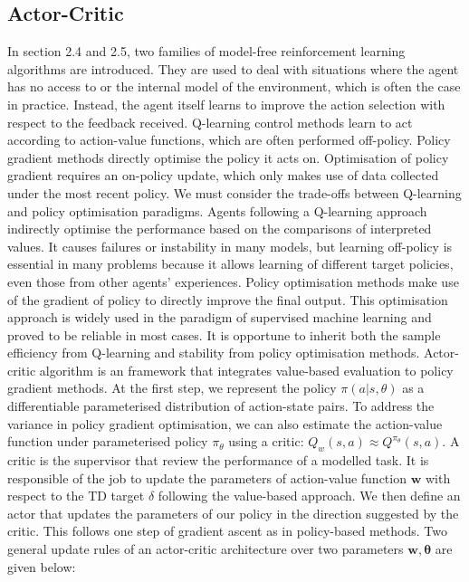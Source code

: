\documentclass[oneside,11pt,a4paper]{article}
\begin{document}
\subsection{Actor-Critic}
In section 2.4 and 2.5, two families of model-free reinforcement learning algorithms are introduced. They are used to deal with situations where the agent has no access to or the internal model of the environment, which is often the case in practice. Instead, the agent itself learns to improve the action selection with respect to the feedback received. Q-learning control methods learn to act according to action-value functions, which are often performed off-policy. Policy gradient methods directly optimise the policy it acts on. Optimisation of policy gradient requires an on-policy update, which only makes use of data collected under the most recent policy.
\newline
\newline
\noindent
We must consider the trade-offs between Q-learning and policy optimisation paradigms. Agents following a Q-learning approach indirectly optimise the performance based on the comparisons of interpreted values. It causes failures or instability in many models, but learning off-policy is essential in many problems because it allows learning of different target policies, even those from other agents' experiences. Policy optimisation methods make use of the gradient of policy to directly improve the final output. This optimisation approach is widely used in the paradigm of supervised machine learning  and proved to be reliable in most cases. It is opportune to inherit both the sample efficiency from Q-learning and stability from policy optimisation methods.
\newline
\newline
\noindent
Actor-critic algorithm is an framework that integrates value-based evaluation to policy gradient methods. At the first step, we represent the policy $\pi(a|s,\theta)$ as a differentiable parameterised distribution of action-state pairs. To address the variance in policy gradient optimisation, we can also estimate the action-value function under parameterised policy $\pi_\theta$ using a critic: $Q_w(s,a)\approx Q^{\pi_\theta}(s,a)$. A critic is the supervisor that review the performance of a modelled task. It is responsible of the job to update the parameters of action-value function $\mathbf w$ with respect to the TD target $\delta$ following the value-based approach. We then define an actor that updates the parameters of our policy in the direction suggested by the critic. This follows one step of gradient ascent as in policy-based methods. Two general update rules of an actor-critic architecture over two parameters $\mathbf w, \mathbf \theta$ are given below:
\end{document}
